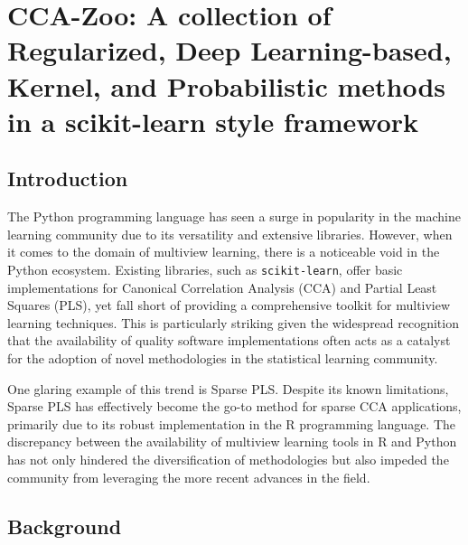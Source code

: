 \graphicspath{{chapters/software/}}
\chapter{CCA-Zoo: A collection of Regularized, Deep Learning-based, Kernel, and Probabilistic methods in a scikit-learn style framework}\label{ch:ccazoo}


\section{Introduction}

The Python programming language has seen a surge in popularity in the machine learning community due to its versatility and extensive libraries.
However, when it comes to the domain of multiview learning, there is a noticeable void in the Python ecosystem.
Existing libraries, such as \texttt{scikit-learn}\cite{pedregosa2011scikit}, offer basic implementations for Canonical Correlation Analysis (CCA) and Partial Least Squares (PLS), yet fall short of providing a comprehensive toolkit for multiview learning techniques.
This is particularly striking given the widespread recognition that the availability of quality software implementations often acts as a catalyst for the adoption of novel methodologies in the statistical learning community.

One glaring example of this trend is Sparse PLS. Despite its known limitations, Sparse PLS has effectively become the go-to method for sparse CCA applications, primarily due to its robust implementation in the R programming language.
The discrepancy between the availability of multiview learning tools in R and Python has not only hindered the diversification of methodologies but also impeded the community from leveraging the more recent advances in the field.

\section{Background}

